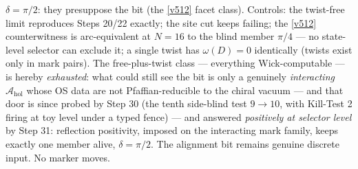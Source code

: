 $\delta = \pi/2$: they presuppose the bit (the \vref{v512} facet class). Controls: the
twist-free limit reproduces Steps 20/22 exactly; the site cut keeps failing; the \vref{v512}
counterwitness is arc-equivalent at $N = 16$ to the blind member $\pi/4$ --- no state-level
selector can exclude it; a single twist has $\omega(D) = 0$ identically (twists exist only in
mark pairs). The free-plus-twist class --- everything Wick-computable --- is hereby
\emph{exhausted}: what could still see the bit is only a genuinely \emph{interacting}
$\mathcal A_{\mathrm{hol}}$ whose OS data are not Pfaffian-reducible to the chiral vacuum ---
and that door is since probed by Step 30 (the tenth side-blind test $9\to10$, with Kill-Test 2
firing at toy level under a typed fence) --- and answered \emph{positively at selector level} by
Step 31: reflection positivity, imposed on the interacting mark family, keeps exactly one member
alive, $\delta=\pi/2$.
The alignment bit remains genuine discrete input. No marker moves.

